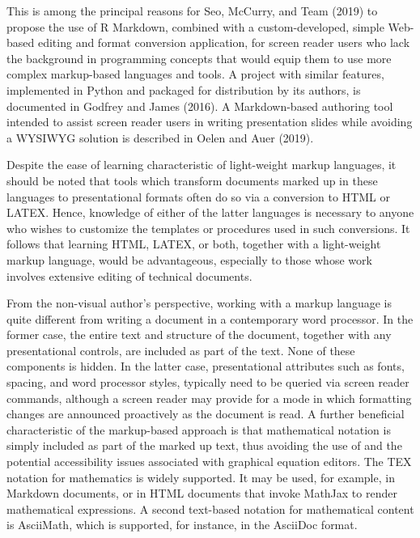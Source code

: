 \documentclass[11pt]{sig-alternate}
\begin{document}
\begin{large}
This is among the principal reasons for Seo, McCurry, and Team (2019) to propose the use of R Markdown, combined with a custom-developed, simple Web-based editing and format conversion application, for screen reader users who lack the background in programming concepts that would equip them to use more complex markup-based languages and tools. A project with similar features, implemented in Python and packaged for distribution by its authors, is documented in Godfrey and James (2016). A Markdown-based authoring tool intended to assist screen reader users in writing presentation slides while avoiding a WYSIWYG solution is described in Oelen and Auer (2019).

Despite the ease of learning characteristic of light-weight markup languages, it should be noted that tools which transform documents marked up in these languages to presentational formats often do so via a conversion to HTML or LATEX. Hence, knowledge of either of the latter languages is necessary to anyone who wishes to customize the templates or procedures used in such conversions. It follows that learning HTML, LATEX, or both, together with a light-weight markup language, would be advantageous, especially to those whose work involves extensive editing of technical documents.

From the non-visual author’s perspective, working with a markup language is quite different from writing a document in a contemporary word processor. In the former case, the entire text and structure of the document, together with any presentational controls, are included as part of the text. None of these components is hidden. In the latter case, presentational attributes such as fonts, spacing, and word processor styles, typically need to be queried via screen reader commands, although a screen reader may provide for a mode in which formatting changes are announced proactively as the document is read. A further beneficial characteristic of the markup-based approach is that mathematical notation is simply included as part of the marked up text, thus avoiding the use of and the potential accessibility issues associated with graphical equation editors. The TEX notation for mathematics is widely supported. It may be used, for example, in Markdown documents, or in HTML documents that invoke MathJax to render mathematical expressions. A second text-based notation for mathematical content is AsciiMath, which is supported, for instance, in the AsciiDoc format.


\end{large}
\end{document}
